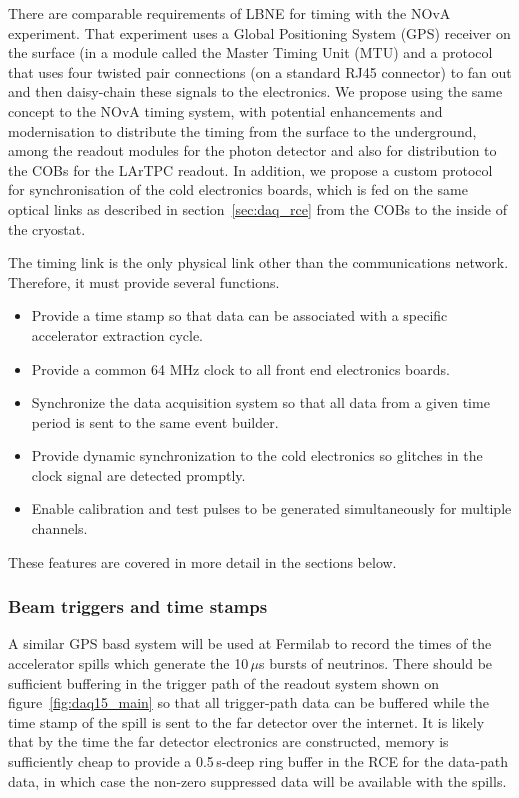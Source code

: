 There are comparable requirements of LBNE for timing with the NOvA
experiment.  That experiment uses a Global Positioning System (GPS)
receiver on the surface (in a module called the Master Timing Unit
(MTU) and a protocol that uses four twisted pair connections (on a
standard RJ45 connector) to fan out and then daisy-chain these signals
to the electronics.  We propose using the same concept to the NOvA
timing system, with potential enhancements and modernisation to
distribute the timing from the surface to the underground, among the
readout modules for the photon detector and also for distribution to
the COBs for the LArTPC readout.  In addition, we propose a custom
protocol for synchronisation of the cold electronics boards, which is
fed on the same optical links as described in
section~\ref{sec:daq_rce} from the COBs to the inside of the cryostat.

The timing link is the only physical link other than the
communications network.  Therefore, it must provide several functions.

\begin{itemize}
\item Provide a time stamp so that data can be associated with a
  specific accelerator extraction cycle.
\item Provide a common 64 MHz clock to all front end electronics
  boards.
\item Synchronize the data acquisition system so that all data from a
  given time period is sent to the same event builder.
\item Provide dynamic synchronization to the cold electronics so
  glitches in the clock signal are detected promptly.
\item Enable calibration and test pulses to be generated
  simultaneously for multiple channels.
\end{itemize}

These features are covered in more detail in the sections below.

\subsubsection{Beam triggers and time stamps}

A similar GPS basd system will be used at Fermilab to record the times
of the accelerator spills which generate the 10\,$\mu$s bursts of
neutrinos.  There should be sufficient buffering in the trigger path
of the readout system shown on figure~\ref{fig:daq15_main} so that all
trigger-path data can be buffered while the time stamp of the spill is
sent to the far detector over the internet.  It is likely  that by
the time the far detector electronics are constructed, memory is
sufficiently cheap to provide a 0.5\,s-deep ring buffer in the RCE for
the data-path data, in which case the non-zero suppressed data will be
available with the spills.

